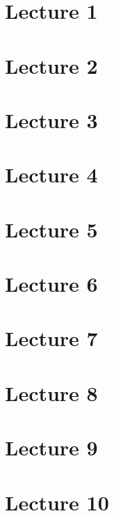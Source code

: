 \documentclass[11pt]{report}
\begin{document}
\tableofcontents

\chapter{Lecture 1}


\chapter{Lecture 2}


\chapter{Lecture 3}


\chapter{Lecture 4}


\chapter{Lecture 5}


\chapter{Lecture 6}


\chapter{Lecture 7}


\chapter{Lecture 8}


\chapter{Lecture 9}


\chapter{Lecture 10}

\end{document}
